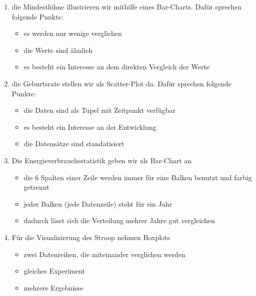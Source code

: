 \begin{enumerate}
	\item die Mindestlöhne illustrieren wir mithilfe eines Bar-Charts. Dafür sprechen folgende Punkte:
	\begin{itemize}
		\item es werden nur wenige verglichen
		\item die Werte sind ähnlich
		\item es besteht ein Interesse an dem direkten Vergleich der Werte
	\end{itemize}
	\item die Geburtsrate stellen wir als Scatter-Plot da. Dafür sprechen folgende Punkte:
	\begin{itemize}
		\item die Daten sind als Tupel mit Zeitpunkt verfügbar
		\item es besteht ein Interesse an der Entwicklung
		\item die Datensätze sind standatisiert
	\end{itemize}
	\item Die Energieverbrauchsstatistik geben wir als Bar-Chart an
	\begin{itemize}
		\item die 6 Spalten einer Zeile werden immer für eine Balken benutzt und farbig getrennt
		\item jeder Balken (jede Datenzeile) steht für ein Jahr
		\item dadurch lässt sich die Verteilung mehrer Jahre gut vergleichen
	\end{itemize}
	\item Für die Visualizierung des Stroop nehmen Boxplots
	\begin{itemize}
		\item zwei Datenreihen, die miteinander verglichen werden
		\item gleiches Experiment
		\item mehrere Ergebnisse
	\end{itemize}
\end{enumerate}
